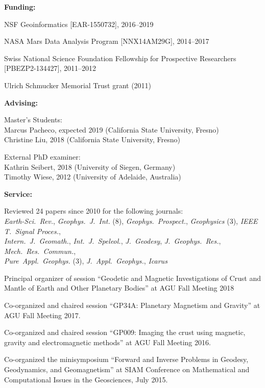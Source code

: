 \documentclass[10pt]{article}
\begin{document}
\spc
\textbf{\tsize Funding:}

\spcp
  NSF Geoinformatics
  [EAR-1550732],
  2016--2019

 \spcp 
NASA Mars Data Analysis Program [NNX14AM29G], 2014--2017

\spcp
Swiss National Science Foundation Fellowship for Prospective Researchers
[PBEZP2-134427], 2011--2012

\spcp
Ulrich Schmucker Memorial Trust grant (2011)

\spc
\textbf{\tsize Advising:}

\spcp
Master's Students:\\
Marcus Pacheco, expected 2019 (California State University, Fresno)\\
Christine Liu, 2018 (California State University, Fresno)

\spcp
External PhD examiner:\\
Kathrin Seibert, 2018 (University of Siegen, Germany)\\
Timothy Wiese, 2012 (University of Adelaide, Australia)



\spc
\textbf{\tsize Service:}

\spcp
Reviewed 24 papers since 2010 for the following journals:\\
\emph{Earth-Sci.~Rev.},
\emph{Geophys.~J.~Int.} (8),
\emph{Geophys.~Prospect.},
\emph{Geophysics} (3),
\emph{IEEE T.~Signal Proces.},\\
\emph{Intern.~J.~Geomath.},
\emph{Int.~J.~Speleol.},
\emph{J.~Geodesy},
\emph{J.~Geophys.~Res.},
\emph{Mech.~Res.~Commun.},\\
\emph{Pure~Appl.~Geophys.} (3),
\emph{J.~Appl.~Geophys.},
\emph{Icarus}

\spcp
Principal organizer of session
``Geodetic and Magnetic Investigations of Crust and Mantle of Earth
and Other Planetary Bodies''
at AGU Fall Meeting 2018

\spcp
Co-organized and chaired session
``GP34A: Planetary Magnetism and Gravity''
at AGU Fall Meeting 2017.
          
\spcp
Co-organized and chaired session
``GP009: Imaging the crust using magnetic, gravity and electromagnetic methods''
at AGU Fall Meeting 2016.

\spcp
Co-organized the minisymposium
``Forward and Inverse Problems in Geodesy, Geodynamics, and Geomagnetism''
at SIAM Conference on Mathematical and Computational Issues in the Geosciences, July 2015.
\end{document}

